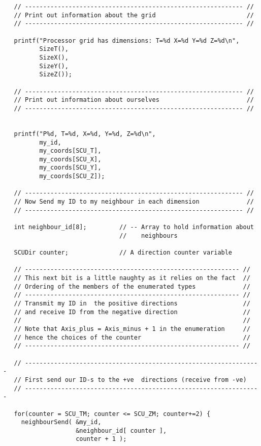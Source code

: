 {\begin{verbatim}
   // ------------------------------------------------------------ //
   // Print out information about the grid                         //
   // ------------------------------------------------------------ //

   printf("Processor grid has dimensions: T=%d X=%d Y=%d Z=%d\n",
          SizeT(),
          SizeX(),
          SizeY(),
          SizeZ());

   // ------------------------------------------------------------ //
   // Print out information about ourselves                        //
   // ------------------------------------------------------------ //


   printf("P%d, T=%d, X=%d, Y=%d, Z=%d\n",
          my_id,
          my_coords[SCU_T],
          my_coords[SCU_X],
          my_coords[SCU_Y],
          my_coords[SCU_Z]);

   // ------------------------------------------------------------ //
   // Now Send my ID to my neighbour in each dimension             //
   // ------------------------------------------------------------ //

   int neighbour_id[8];         // -- Array to hold information about
                                //    neighbours

   SCUDir counter;              // A direction counter variable

   // ----------------------------------------------------------- //
   // This next bit is a little naughty as it relies on the fact  //
   // Ordering of the members of the enumerated types             //
   // ----------------------------------------------------------- //
   // Transmit my ID in  the positive directions                  //
   // and receive ID from the negative direction                  //
   //                                                             //
   // Note that Axis_plus = Axis_minus + 1 in the enumeration     //
   // hence the choices of the counter                            //
   // ----------------------------------------------------------- //
    
   // -----------------------------------------------------------------
   // First send our ID-s to the +ve  directions (receive from -ve)
   // -----------------------------------------------------------------

   for(counter = SCU_TM; counter <= SCU_ZM; counter+=2) {
     neighbourSend( &my_id,
                    &neighbour_id[ counter ],
                    counter + 1 );
                    

\end{verbatim}}
